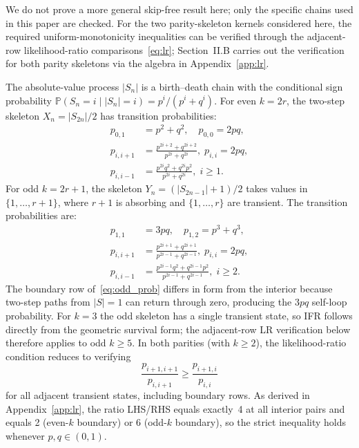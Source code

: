 \documentclass[pdflatex,sn-mathphys-num]{sn-jnl}
\theoremstyle{definition}
\newcommand{\Prob}{\mathbb{P}}
\numberwithin{equation}{section}
\begin{document}
We do not prove a more general skip-free result here; only the specific chains used in this paper are checked. For the two parity-skeleton kernels considered here, the required uniform-monotonicity inequalities can be verified through the adjacent-row likelihood-ratio comparisons~\eqref{eq:lr}; Section~II.B carries out the verification for both parity skeletons via the algebra in Appendix~\ref{app:lr}.

The absolute-value process $|S_n|$ is a birth--death chain with the conditional sign probability $\Prob(S_n=i\mid |S_n|=i) = p^i/(p^i+q^i)$. For even $k=2r$, the two-step skeleton $X_n = |S_{2n}|/2$ has transition probabilities:
\begin{equation}\label{eq:even_prob}
\begin{aligned}
p_{0,1} &= p^2{+}q^2,\quad p_{0,0}=2pq,\\
p_{i,i+1} &= \tfrac{p^{2i+2}+q^{2i+2}}{p^{2i}+q^{2i}},\;
p_{i,i} = 2pq,\\
p_{i,i-1} &= \tfrac{p^{2i}q^2+q^{2i}p^2}{p^{2i}+q^{2i}},\; i\ge 1.
\end{aligned}
\end{equation}
For odd $k=2r+1$, the skeleton $Y_n=(|S_{2n-1}|+1)/2$ takes values in $\{1,\dots,r{+}1\}$, where $r{+}1$ is absorbing and $\{1,\dots,r\}$ are transient. The transition probabilities are:
\begin{equation}\label{eq:odd_prob}
\begin{aligned}
p_{1,1} &= 3pq,\quad p_{1,2} = p^3{+}q^3,\\
p_{i,i+1} &= \tfrac{p^{2i+1}+q^{2i+1}}{p^{2i-1}+q^{2i-1}},\;
p_{i,i} = 2pq,\\
p_{i,i-1} &= \tfrac{p^{2i-1}q^2+q^{2i-1}p^2}{p^{2i-1}+q^{2i-1}},\; i\ge 2.
\end{aligned}
\end{equation}
The boundary row of~\eqref{eq:odd_prob} differs in form from the interior because two-step paths from $|S|=1$ can return through zero, producing the $3pq$ self-loop probability. For $k=3$ the odd skeleton has a single transient state, so IFR follows directly from the geometric survival form; the adjacent-row LR verification below therefore applies to odd $k\ge 5$. In both parities (with $k\ge 2$), the likelihood-ratio condition reduces to verifying
\begin{equation}\label{eq:lr}
\frac{p_{i+1,i+1}}{p_{i,i+1}} \ge \frac{p_{i+1,i}}{p_{i,i}}
\end{equation}
for all adjacent transient states, including boundary rows. As derived in Appendix~\ref{app:lr}, the ratio LHS/RHS equals exactly~4 at all interior pairs and equals 2 (even-$k$ boundary) or 6 (odd-$k$ boundary), so the strict inequality holds whenever $p,q\in(0,1)$.
\end{document}
